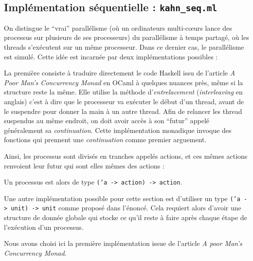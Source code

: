 \subsection{Implémentation séquentielle :
\texttt{kahn\_seq.ml}}\label{impluxe9mentation-suxe9quentielle-paralluxe9lisme-simuluxe9-kahnux5fseq.ml}

On distingue le ``vrai'' parallélisme (où un ordinateurs multi-cœurs
lance des processus sur plusieurs de ses processeurs) du parallélisme à
temps partagé, où les threads s'exécutent sur un même processeur. Dans
ce dernier cas, le parallélisme est simulé. Cette idée est incarnée par
deux implémentations possibles :

La première consiste à traduire directement le code Haskell issu de
l'article \emph{A Poor Man's Concurrency Monad} en OCaml à quelques
nuances près, même si la structure reste la même. Elle utilise la
méthode d'\emph{entrelacement} (\emph{interleaving} en anglais) c'est à
dire que le processeur va exécuter le début d'un thread, avant de le
suspendre pour donner la main à un autre thread. Afin de relancer les
thread suspendus au même endroit, on doit avoir accès à son ``futur''
appelé généralement sa \emph{continuation}. Cette implémentation
monadique invoque des fonctions qui prennent une \emph{continuation}
comme premier arguement.

Ainsi, les processus sont divisés en tranches appelés actions, et ces
mêmes actions renvoient leur futur qui sont elles mêmes des actions :

\begin{Shaded}
\begin{Highlighting}[]
 
  \NormalTok{| }
  \NormalTok{| }  \NormalTok{(} 
  \NormalTok{| }  
\end{Highlighting}
\end{Shaded}

Un processus est alors de type
\texttt{('a -\textgreater{} action) -\textgreater{} action}.

Une autre implémentation possible pour cette section est d'utiliser un
type \texttt{('a -\textgreater{} unit) -\textgreater{} unit} comme
proposé dans l'énoncé. Cela requiert alors d'avoir une structure de
donnée globale qui stocke ce qu'il reste à faire après chaque étape de
l'exécution d'un processus.

Nous avons choisi ici la première implémentation issue de l'article \emph{A
poor Man's Concurrency Monad}.


